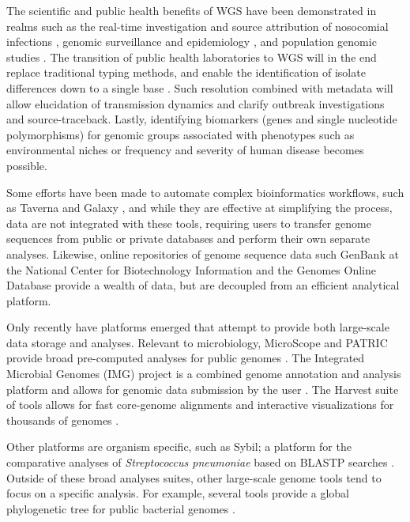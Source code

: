 \documentclass[doublespacing, linenumbers]{bmcart}
\begin{document}
The scientific and public health benefits of WGS have been demonstrated in realms such as  the real-time investigation and source attribution of nosocomial infections \cite{halachev_genomic_2014, harris_whole-genome_2013,graham_real-time_2014}, genomic surveillance and epidemiology \cite{cody_real-time_2013}, and population genomic studies \cite{nasser_evolutionary_2014,kopac_genomic_2014}. The transition of public health laboratories to WGS will in the end replace traditional typing methods, and enable the identification of isolate differences down to a single base \cite{grad_epidemiologic_2014}. Such resolution combined with metadata will allow elucidation of transmission dynamics and clarify outbreak investigations and source-traceback. Lastly, identifying biomarkers (genes and single nucleotide polymorphisms) for genomic groups associated with phenotypes such as environmental niches or frequency and severity of human disease becomes possible.

Some efforts have been made to automate complex bioinformatics workflows, such as Taverna \cite{lanzen_taverna_2008} and Galaxy \cite{goecks_galaxy:_2010}, and while they are effective at simplifying the process, data are not integrated with these tools, requiring users to transfer genome sequences from public or private databases and perform their own separate analyses. Likewise, online repositories of genome sequence data such GenBank at the National Center for Biotechnology Information \cite{benson_genbank_2012} and the Genomes Online Database \cite{pagani_genomes_2012} provide a wealth of data, but are decoupled from an efficient analytical platform.

Only recently have platforms emerged that attempt to provide both large-scale data storage and analyses. Relevant to microbiology, MicroScope and PATRIC provide broad pre-computed analyses for public genomes  \cite{vallenet_microscope--integrated_2012,wattam_patric_2013}. The Integrated Microbial Genomes (IMG) project is a combined genome annotation and analysis platform and allows for genomic data submission by the user \cite{markowitz_img_2013}. The Harvest suite of tools allows for fast core-genome alignments and interactive visualizations for thousands of genomes \cite{treangen_rapid_2014}.

Other platforms are organism specific, such as Sybil; a platform for the comparative analyses of \textit{Streptococcus pneumoniae} based on BLASTP searches \cite{riley_using_2012}. Outside of these broad analyses suites, other large-scale genome tools tend to focus on a specific analysis. For example, several tools provide a global phylogenetic tree for public bacterial genomes \cite{letunic_interactive_2011,fang_daily-updated_2013,federhen_ncbi_2011}.  
\end{document}
